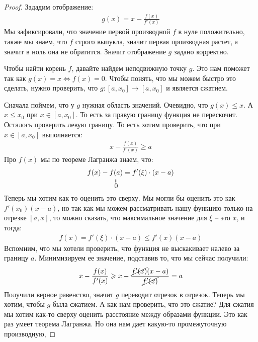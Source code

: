 \begin{proof}
    Зададим отображение: 
    \begin{gather*}
        g(x) = x - \frac{f(x)}{f'(x)}
    \end{gather*}
    Мы зафиксировали, что значение первой производной $f$ в нуле положительно, также мы знаем, что $f$ строго выпукла, значит первая производная 
    растет, а значит в ноль она не обратится. Значит отображение $g$ задано корректно. 

    Чтобы найти корень $f$, давайте найдем неподвижную точку $g$. Это нам поможет так как $g(x) = x \Longleftrightarrow f(x) = 0$. Чтобы понять, что мы можем быстро это сделать, 
    нужно проверить, что $g: [a, x_0] \longrightarrow [a, x_0]$ и является сжатием.

    Сначала поймем, что у $g$ нужная область значений. 
    Очевидно, что $g(x) \leqslant x$. А $x \leqslant x_0$ при $x \in [a, x_0]$. 
    То есть за правую границу функция не перескочит. Осталось проверить левую границу. То есть хотим проверить, что при $x \in [a, x_0]$ выполняется:
    \begin{gather*}
        x - \frac{f(x)}{f'(x)} \geqslant a
    \end{gather*}
    Про $f(x)$ мы по теореме Лагранжа знаем, что:
    \begin{gather*}
        f(x) - \stackbelow{f(a)}{0} = f'(\xi)\cdot(x - a)
    \end{gather*}
    Теперь мы хотим как то оценить это сверху. 
    Мы могли бы оценить это как $f'(x_0)(x - a)$, но так как мы можем рассматривать 
    нашу функцию только на отрезке $[a, x]$, то можно сказать, что максимальное значение для $\xi$ -- это $x$, и тогда: 
    \begin{gather*}
        f(x) = f'(\xi)\cdot(x - a) \leqslant f'(x)(x-a)
    \end{gather*}
    Вспомним, что мы хотели проверить, что функция не выскакивает налево за границу $a$. 
    Минимизируем ее значение, подставив то, что мы сейчас получили:
    \begin{gather*}
        x - \frac{f(x)}{f'(x)} \geqslant x - \frac{\cancel{f'(x)}(x - a)}{\cancel{f'(x)}} = a
    \end{gather*}
    Получили верное равенство, значит $g$ переводит отрезок в отрезок. 
    Теперь мы хотим, чтобы $g$ была сжатием. А как нам проверить, что это сжатие? 
    Для сжатия мы хотим как-то сверху оценить расстояние между образами функции. 
    Это как раз умеет теорема Лагранжа. Но она нам дает какую-то промежуточную производную, 

\end{proof}
